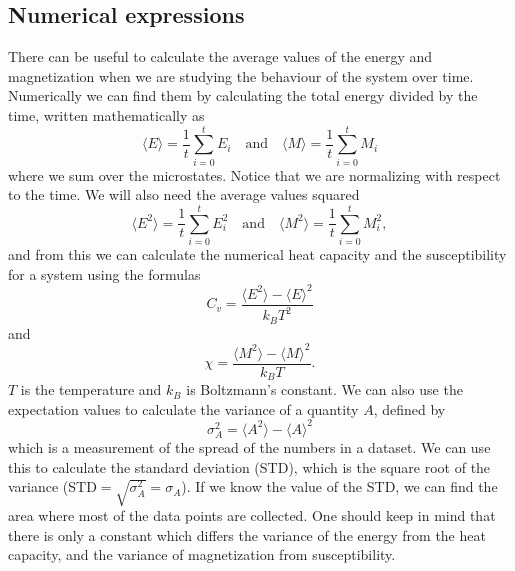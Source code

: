 \documentclass[norsk,a4paper,12pt]{article}
\begin{document}
\subsection{Numerical expressions}
There can be useful to calculate the average values of the energy and magnetization when we are studying the behaviour of the system over time. Numerically we can find them by calculating the total energy divided by the time, written mathematically as 
\begin{equation}
\langle E\rangle = \frac{1}{t}\sum_{i=0}^t E_i\quad\text{and}\quad
\langle M\rangle = \frac{1}{t}\sum_{i=0}^t M_i
\end{equation}
where we sum over the microstates. Notice that we are normalizing with respect to the time. We will also need the average values squared
\begin{equation}
\langle E^2\rangle = \frac{1}{t}\sum_{i=0}^t E_i^2\quad\text{and}\quad
\langle M^2\rangle = \frac{1}{t}\sum_{i=0}^t M_i^2,
\end{equation}
and from this we can calculate the numerical heat capacity and the susceptibility for a system using the formulas
\begin{equation}
C_v=\frac{\langle E^2\rangle - \langle E\rangle^2}{k_BT^2}
\label{eq:Heat}
\end{equation}
and
\begin{equation}
\chi=\frac{\langle M^2\rangle - \langle M\rangle^2}{k_BT}.
\label{eq:suscept}
\end{equation}
$T$ is the temperature and $k_B$ is Boltzmann's constant. We can also use the expectation values to calculate the variance of a quantity $A$, defined by
\begin{equation}
\sigma_A^2=\langle A^2\rangle-\langle A\rangle^2
\end{equation}
which is a measurement of the spread of the numbers in a dataset. We can use this to calculate the standard deviation (STD), which is the square root of the variance (STD$=\sqrt{\sigma_A^2}=\sigma_A$). If we know the value of the STD, we can find the area where most of the data points are collected. One should keep in mind that there is only a constant which differs the variance of the energy from the heat capacity, and the variance of magnetization from susceptibility. 
\end{document}
